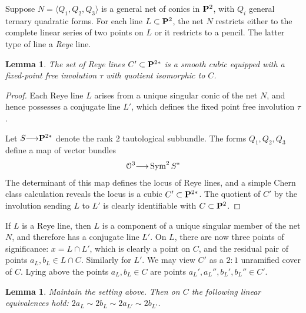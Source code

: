 \documentclass[11pt,reqno]{amsart}
\theoremstyle{plain}
\newtheorem{lemma}[theorem]{Lemma}
\theoremstyle{definition}
\theoremstyle{remark}
\numberwithin{equation}{section}
\renewcommand{\to}{{\longrightarrow}}
\numberwithin{equation}{section}
\renewcommand{\O}{\mathcal O}
\begin{document}
Suppose $N = \langle Q_{1}, Q_{2}, Q_{3} \rangle$ is a general net of conics in $\P^{2}$, with $Q_{i}$ general ternary quadratic forms. For each line $L \subset \P^{2}$, the net $N$ restricts either to the complete linear series of two points on $L$ or it restricts to a pencil.   The latter type of line a {\sl Reye} line. 

\begin{lemma}
   \label{lem:specialLines}
   The set of Reye lines $C' \subset \P^{2*}$ is a smooth  cubic equipped with a fixed-point free involution $\tau$ with quotient isomorphic to $C$.
 \end{lemma}  

\begin{proof}
  Each Reye line $L$ arises from a unique singular conic of the net $N$, and hence possesses a conjugate line $L'$, which defines the fixed point free involution $\tau$. 

  Let $S \to \P^{2*}$ denote the rank $2$ tautological subbundle. The forms $Q_{1},Q_{2},Q_{3}$ define a map of vector bundles 
  \begin{align*}
    \O^{3} \to \Sym^{2}S^{*}
  \end{align*}
  The determinant of this map defines the locus of Reye lines, and a simple Chern class calculation reveals the locus is a cubic $C' \subset \P^{2*}$.  The quotient of $C'$ by the involution sending $L$ to $L'$ is clearly identifiable with $C \subset \P^{2}$.
\end{proof}


If $L$ is a Reye line, then $L$ is a component of a unique singular member of the net $N$, and therefore has a conjugate line $L'$.  On $L$, there are now three points of significance: $x = L \cap L'$, which is clearly a point on $C$, and the residual pair of points $a_{L}, b_{L} \in L \cap C$. Similarly for $L'$.  We may view $C'$ as a $2:1$ unramified cover of $C$. Lying above the points $a_{L},b_{L} \in C$ are points $a_{L}',a_{L}'', b_{L}', b_{L}'' \in C'$. 

\begin{lemma}
  \label{lem:lineEq}
  Maintain the setting above. Then on $C$ the following linear equivalences hold: $2a_{L} \sim 2b_{L} \sim 2a_{L'} \sim 2b_{L'}$.
\end{lemma}
\end{document}
